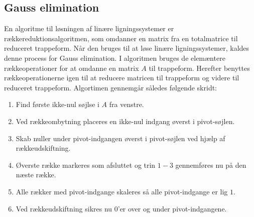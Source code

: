 \subsection{Gauss elimination}
En algoritme til løsningen af linære ligningssystemer er  rækkereduktionsalgoritmen, som omdanner en matrix fra en totalmatrice til reduceret trappeform.
Når den bruges til at løse linære ligningssystemer, kaldes denne process for Gauss elimination.
I algoritmen bruges de elemæntere rækkeoperationer for at omdanne en matrix $A$ til trappeform. 
Herefter benyttes rækkeoperationerne igen til at reducere matricen til trappeform og videre til reduceret trappeform.
Algortimen gennemgår således følgende skridt:
%
\begin{enumerate}
\item Find første ikke-nul søjlse i $A$ fra venstre.
\item Ved rækkeombytning placeres en ikke-nul indgang øverst i pivot-søjlen.
\item Skab nuller under pivot-indgangen øverst i pivot-søjlen ved hjælp af rækkeudskiftning.
\item Øverste række markeres som afsluttet og trin $1-3$ gennemføres nu på den næste række.
\item Alle rækker med pivot-indgange skaleres så alle pivot-indgange er lig $1$.
\item Ved rækkeudskiftning sikres nu $0$'er over og under pivot-indgangene.
\end{enumerate}
